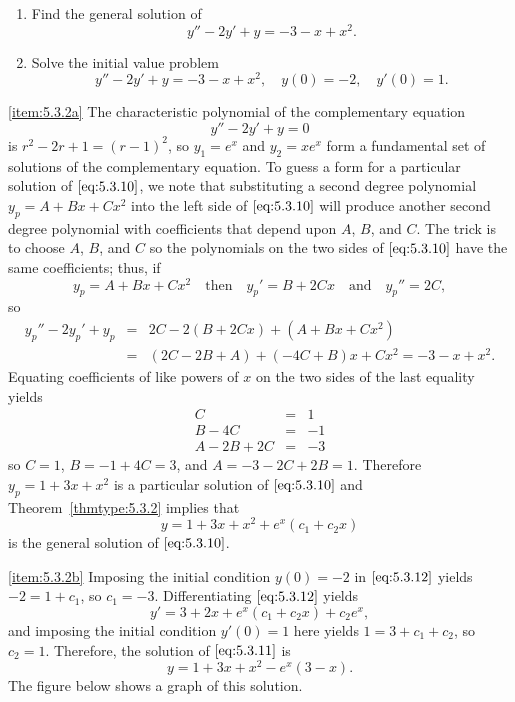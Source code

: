 \documentclass{ximera}
\begin{document}
 
 
\begin{example}\label{example:5.3.2}
\begin{enumerate}
\item \label{item:5.3.2a} %
Find the general solution of
\begin{equation} \label{eq:5.3.10}
y''-2y'+y=-3-x+x^2.
\end{equation}
\item \label{item:5.3.2b} %
Solve the initial value problem
\begin{equation} \label{eq:5.3.11}
y''-2y'+y=-3-x+x^2, \quad  y(0)=-2,\quad y'(0)=1.
\end{equation}
\end{enumerate}
 
\begin{explanation}
\ref{item:5.3.2a} The characteristic polynomial of the complementary equation
$$
y''-2y'+y=0
$$
is $r^2-2r+1=(r-1)^2$,
so $y_1=e^x$ and $y_2=xe^x$  form a fundamental set of solutions
of the complementary equation. To guess  a form for a particular
solution of $\eqref{eq:5.3.10}$, we note that substituting a second
degree polynomial $y_p=A+Bx+Cx^2$ into the left side of $\eqref{eq:5.3.10}$
will produce another second degree polynomial with coefficients that
depend upon $A$, $B$, and $C$. The trick is to choose $A$, $B$, and
$C$ so the polynomials on the two sides of $\eqref{eq:5.3.10}$ have the
same coefficients;   thus,
if
$$
y_p=A+Bx+Cx^2\quad\mbox{then}\quad
y_p'=B+2Cx\quad\mbox{and}\quad y_p''=2C,
$$
so
\begin{eqnarray*}
y_p''-2y_p'+y_p&=&2C-2(B+2Cx)+(A+Bx+Cx^2)\\
&=&(2C-2B+A)+(-4C+B)x+Cx^2=-3-x+x^2.
\end{eqnarray*}
Equating  coefficients of like powers of $x$ on the two sides of the
last equality yields
\begin{eqnarray*}
C&=&1\\
B-4C&=&-1\\
A-2B+2C&=& -3
\end{eqnarray*}
so $C=1$, $B=-1+4C=3$, and $A=-3-2C+2B=1$.
Therefore $y_p=1+3x+x^2$ is a particular solution of
$\eqref{eq:5.3.10}$ and  Theorem~\ref{thmtype:5.3.2} implies that
\begin{equation} \label{eq:5.3.12}
y=1+3x+x^2+e^x(c_1+c_2x)
\end{equation}
is the general solution of $\eqref{eq:5.3.10}$.
 
\ref{item:5.3.2b} Imposing the initial condition $y(0)=-2$ in
$\eqref{eq:5.3.12}$ yields $-2=1+c_1$, so $c_1=-3$. Differentiating
$\eqref{eq:5.3.12}$ yields
$$
y'=3+2x+e^x(c_1+c_2x)+c_2e^x,
$$
and imposing the initial condition $y'(0)=1$ here yields
$1=3+c_1+c_2$, so $c_2=1$. Therefore, the solution of $\eqref{eq:5.3.11}$
is
$$
y=1+3x+x^2-e^x(3-x).
$$
The figure below shows a graph of this solution.


\end{explanation}
\end{example}
\end{document}
